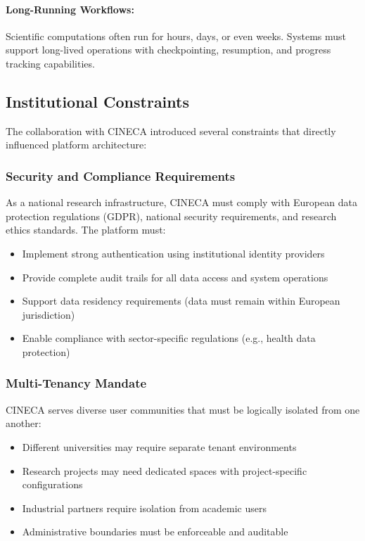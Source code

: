 \documentclass[a4paper,twoside]{sapthesis}
\begin{document}
\paragraph{Long-Running Workflows:}
Scientific computations often run for hours, days, or even weeks. Systems must support long-lived operations with checkpointing, resumption, and progress tracking capabilities.

\subsection{Institutional Constraints}

The collaboration with CINECA introduced several constraints that directly influenced platform architecture:

\subsubsection{Security and Compliance Requirements}

As a national research infrastructure, CINECA must comply with European data protection regulations (GDPR), national security requirements, and research ethics standards. The platform must:

\begin{itemize}
    \item Implement strong authentication using institutional identity providers
    \item Provide complete audit trails for all data access and system operations
    \item Support data residency requirements (data must remain within European jurisdiction)
    \item Enable compliance with sector-specific regulations (e.g., health data protection)
\end{itemize}

\subsubsection{Multi-Tenancy Mandate}

CINECA serves diverse user communities that must be logically isolated from one another:

\begin{itemize}
    \item Different universities may require separate tenant environments
    \item Research projects may need dedicated spaces with project-specific configurations
    \item Industrial partners require isolation from academic users
    \item Administrative boundaries must be enforceable and auditable
\end{itemize}
\end{document}
